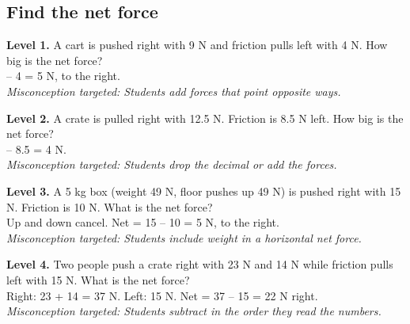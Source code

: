 \documentclass[11pt]{article}
\begin{document}
\subsection*{Find the net force}
\noindent\textbf{Level 1.} A cart is pushed right with 9 N and friction pulls left with 4 N. How big is the net force?\\   -- 4 = 5 N, to the right.\\ \textit{Misconception targeted: Students add forces that point opposite ways.}\par\medskip
\noindent\textbf{Level 2.} A crate is pulled right with 12.5 N. Friction is 8.5 N left. How big is the net force?\\   -- 8.5 = 4 N.\\ \textit{Misconception targeted: Students drop the decimal or add the forces.}\par\medskip
\noindent\textbf{Level 3.} A 5 kg box (weight 49 N, floor pushes up 49 N) is pushed right with 15 N. Friction is 10 N. What is the net force?\\  \quad Up and down cancel. Net = 15 -- 10 = 5 N, to the right.\\ \textit{Misconception targeted: Students include weight in a horizontal net force.}\par\medskip
\noindent\textbf{Level 4.} Two people push a crate right with 23 N and 14 N while friction pulls left with 15 N. What is the net force?\\  \quad Right: 23 + 14 = 37 N. Left: 15 N. Net = 37 -- 15 = 22 N right.\\ \textit{Misconception targeted: Students subtract in the order they read the numbers.}\par\medskip
\end{document}
